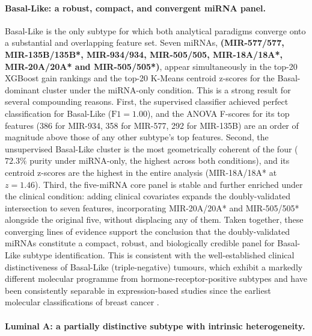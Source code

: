 \paragraph{Basal-Like: a robust, compact, and convergent miRNA panel.}

Basal-Like is the only subtype for which both analytical paradigms converge onto a
substantial and overlapping feature set. Seven miRNAs, \textbf{(MIR-577/577, 
MIR-135B/135B*, MIR-934/934, MIR-505/505, MIR-18A/18A*, MIR-20A/20A* and 
MIR-505/505*)}, appear simultaneously in the top-20
XGBoost gain rankings and the top-20 K-Means centroid z-scores for the Basal-dominant
cluster under the miRNA-only condition. This is a strong result for several compounding
reasons. First, the supervised classifier achieved perfect classification for Basal-Like
($\text{F1} = 1.00$), and the ANOVA F-scores for its top features (386 for MIR-934,
358 for MIR-577, 292 for MIR-135B) are an order of magnitude above those of any other
subtype's top features. Second, the unsupervised Basal-Like cluster is the most
geometrically coherent of the four ($72.3\%$ purity under miRNA-only, the highest
across both conditions), and its centroid z-scores are the highest in the entire
analysis (MIR-18A/18A* at $z = 1.46$). Third, the five-miRNA core panel is stable and
further enriched under the clinical condition: adding clinical covariates expands the
doubly-validated intersection to seven features, incorporating MIR-20A/20A* and
MIR-505/505* alongside the original five, without displacing any of them. Taken
together, these converging lines of evidence support the conclusion that the
doubly-validated miRNAs constitute a compact, robust, and biologically credible panel
for Basal-Like subtype identification. This is consistent with the well-established
clinical distinctiveness of Basal-Like (triple-negative) tumours, which exhibit a
markedly different molecular programme from hormone-receptor-positive subtypes and have
been consistently separable in expression-based studies since the earliest molecular
classifications of breast cancer \cite{bc_molecular_Perou2000}.

\paragraph{Luminal A: a partially distinctive subtype with intrinsic heterogeneity.}


